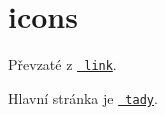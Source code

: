 \chapter{icons}
\hypertarget{md_graphics_2resources_2icons}{}\label{md_graphics_2resources_2icons}
Převzaté z \href{https://www.svgrepo.com/collection/flat-colored-interface-icons/}{\texttt{ link}}.

Hlavní stránka je \href{https://www.svgrepo.com/}{\texttt{ tady}}.

 